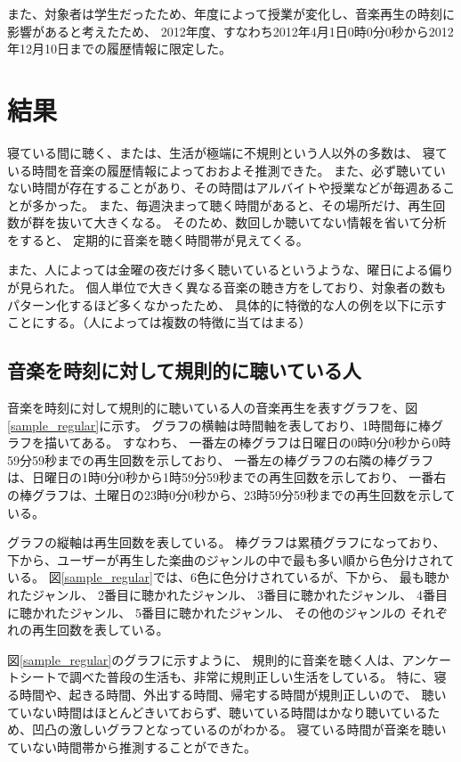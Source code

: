\documentclass[a4paper, 11pt, onecolumn, report]{jsarticle}
\begin{document}
また、対象者は学生だったため、年度によって授業が変化し、音楽再生の時刻に影響があると考えたため、
2012年度、すなわち2012年4月1日0時0分0秒から2012年12月10日までの履歴情報に限定した。


\section{結果}
寝ている間に聴く、または、生活が極端に不規則という人以外の多数は、
寝ている時間を音楽の履歴情報によっておおよそ推測できた。
また、必ず聴いていない時間が存在することがあり、その時間はアルバイトや授業などが毎週あることが多かった。
また、毎週決まって聴く時間があると、その場所だけ、再生回数が群を抜いて大きくなる。
そのため、数回しか聴いてない情報を省いて分析をすると、
定期的に音楽を聴く時間帯が見えてくる。

また、人によっては金曜の夜だけ多く聴いているというような、曜日による偏りが見られた。
個人単位で大きく異なる音楽の聴き方をしており、対象者の数もパターン化するほど多くなかったため、
具体的に特徴的な人の例を以下に示すことにする。（人によっては複数の特徴に当てはまる）

\subsection{音楽を時刻に対して規則的に聴いている人}
音楽を時刻に対して規則的に聴いている人の音楽再生を表すグラフを、図\ref{sample_regular}に示す。
グラフの横軸は時間軸を表しており、1時間毎に棒グラフを描いてある。
すなわち、
一番左の棒グラフは日曜日の0時0分0秒から0時59分59秒までの再生回数を示しており、
一番左の棒グラフの右隣の棒グラフは、日曜日の1時0分0秒から1時59分59秒までの再生回数を示しており、
一番右の棒グラフは、土曜日の23時0分0秒から、23時59分59秒までの再生回数を示している。

グラフの縦軸は再生回数を表している。
棒グラフは累積グラフになっており、下から、ユーザーが再生した楽曲のジャンルの中で最も多い順から色分けされている。
図\ref{sample_regular}では、6色に色分けされているが、下から、
最も聴かれたジャンル、
2番目に聴かれたジャンル、
3番目に聴かれたジャンル、
4番目に聴かれたジャンル、
5番目に聴かれたジャンル、
その他のジャンルの
それぞれの再生回数を表している。

図\ref{sample_regular}のグラフに示すように、
規則的に音楽を聴く人は、アンケートシートで調べた普段の生活も、非常に規則正しい生活をしている。
特に、寝る時間や、起きる時間、外出する時間、帰宅する時間が規則正しいので、
聴いていない時間はほとんどきいておらず、聴いている時間はかなり聴いているため、凹凸の激しいグラフとなっているのがわかる。
寝ている時間が音楽を聴いていない時間帯から推測することができた。
\end{document}
